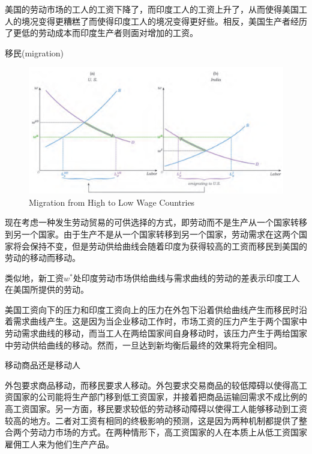 \documentclass{article}
\begin{document}
美国的劳动市场的工人的工资下降了，而印度工人的工资上升了，从而使得美国工人的境况变得更糟糕了而使得印度工人的境况变得更好些。相反，美国生产者经历了更低的劳动成本而印度生产者则面对增加的工资。

\hspace*{\fill}

移民(migration)

\begin{figure}[H] %
	\centering %
	\includegraphics[width=1\textwidth]{20_7} %
	\caption{Migration from High to Low Wage Countries} %
	\label{Fig.main8} %
\end{figure}


现在考虑一种发生劳动贸易的可供选择的方式，即劳动而不是生产从一个国家转移到另一个国家。由于生产不是从一个国家转移到另一个国家，劳动需求在这两个国家将会保持不变，但是劳动供给曲线会随着印度为获得较高的工资而移民到美国的劳动的移动而移动。

类似地，新工资$ w^* $处印度劳动市场供给曲线与需求曲线的劳动的差表示印度工人在美国所提供的劳动。

美国工资向下的压力和印度工资向上的压力在外包下沿着供给曲线产生而移民时沿着需求曲线产生。这是因为当企业移动工作时，市场工资的压力产生于两个国家中劳动需求曲线的移动，而当工人在两给国家间自身移动时，该压力产生于两给国家中劳动供给曲线的移动。然而，一旦达到新均衡后最终的效果将完全相同。

\hspace*{\fill}

移动商品还是移动人

外包要求商品移动，而移民要求人移动。外包要求交易商品的较低障碍以使得高工资国家的公司能将生产部门移到低工资国家，并接着把商品运输回需求不成比例的高工资国家。另一方面，移民要求较低的劳动移动障碍以使得工人能够移动到工资较高的地方。二者对工资有相同的终极影响的预测，这是因为两种机制都提供了整合两个劳动力市场的方式。在两种情形下，高工资国家的人在本质上从低工资国家雇佣工人来为他们生产产品。
\end{document}
